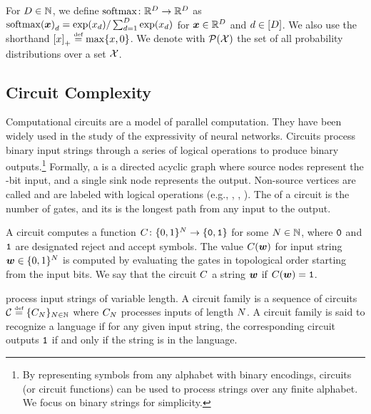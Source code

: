 For ${{D}} \in {{\mathbb{N}}}$, we define ${{\mathrm{softmax}}}\colon{{\mathbb{R}}}^{{D}}\to{{\mathbb{R}}}^{{D}}$ as $\softmaxFun{\vx}{\dimidx} = \exp(\evx_\dimidx)/\sum_{\dimidx=1}^\hiddDim \exp(\evx_\dimidx)$ for ${{{\bm{x}}}}\in{{\mathbb{R}}}^{{D}}$ and ${{d}}\in [{{D}}]$. 
We also use the shorthand ${\left[ x \right]_{+}} \mathrel{\stackrel{\textnormal{\tiny def}}{=}} \max\{x, 0\}$.
We denote with $\probOverFun{\sX}$ the set of all probability distributions over a set ${{{\mathcal{X}}}}$.

\subsection{Circuit Complexity} \label{app:circuit-complexity}
Computational circuits are a model of parallel computation.
They have been widely used in the study of the expressivity of neural networks.
Circuits process binary input strings through a series of logical operations to produce binary outputs.\footnote{By representing symbols from any alphabet with binary encodings, circuits (or circuit functions) can be used to process strings over any finite alphabet. We focus on binary strings for simplicity.}
Formally, a  is a directed acyclic graph where source nodes represent the \strlen-bit input, and a single sink node represents the output. 
Non-source vertices are called  and are labeled with logical operations (e.g., \andGate, \orGate, \notGate). 
The  of a circuit is the number of gates, and its  is the longest path from any input to the output.

A circuit computes a function ${C}\colon \{0,1\}^{{N}} \to \{{\texttt{0}}, {\texttt{1}}\}$ for some ${{N}} \in {{\mathbb{N}}}$, where ${\texttt{0}}$ and ${\texttt{1}}$ are designated reject and accept symbols.
The value $\circuitFun{\str}$ for input string ${{\boldsymbol{w}}} \in \{0,1\}^{{N}}$ is computed by evaluating the gates in topological order starting from the input bits.
We say that the circuit ${C}$  a string ${{\boldsymbol{w}}}$ if $\circuitFun{\str} = \acceptSym$.

 process input strings of variable length.
A circuit family is a sequence of circuits ${{{{\mathcal{C}}}}} \mathrel{\stackrel{\textnormal{\tiny def}}{=}} \{{C}_{{{N}}}\}_{{{N}} \in {{\mathbb{N}}}}$ where ${C}_{{N}}$ processes inputs of length ${{N}}$. 
A circuit family is said to recognize a language if for any given input string, the corresponding circuit outputs ${\texttt{1}}$ if and only if the string is in the language.

